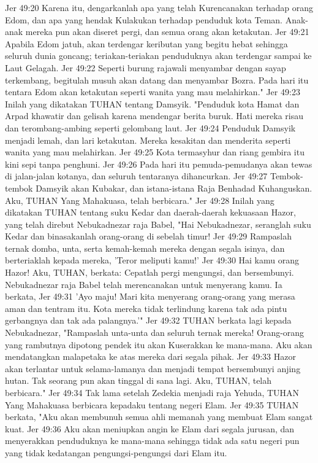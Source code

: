 Jer 49:20  Karena itu, dengarkanlah apa yang telah Kurencanakan terhadap orang Edom, dan apa yang hendak Kulakukan terhadap penduduk kota Teman. Anak-anak mereka pun akan diseret pergi, dan semua orang akan ketakutan.
Jer 49:21  Apabila Edom jatuh, akan terdengar keributan yang begitu hebat sehingga seluruh dunia goncang; teriakan-teriakan penduduknya akan terdengar sampai ke Laut Gelagah.
Jer 49:22  Seperti burung rajawali menyambar dengan sayap terkembang, begitulah musuh akan datang dan menyambar Bozra. Pada hari itu tentara Edom akan ketakutan seperti wanita yang mau melahirkan."
Jer 49:23  Inilah yang dikatakan TUHAN tentang Damsyik. "Penduduk kota Hamat dan Arpad khawatir dan gelisah karena mendengar berita buruk. Hati mereka risau dan terombang-ambing seperti gelombang laut.
Jer 49:24  Penduduk Damsyik menjadi lemah, dan lari ketakutan. Mereka kesakitan dan menderita seperti wanita yang mau melahirkan.
Jer 49:25  Kota termasyhur dan riang gembira itu kini sepi tanpa penghuni.
Jer 49:26  Pada hari itu pemuda-pemudanya akan tewas di jalan-jalan kotanya, dan seluruh tentaranya dihancurkan.
Jer 49:27  Tembok-tembok Damsyik akan Kubakar, dan istana-istana Raja Benhadad Kuhanguskan. Aku, TUHAN Yang Mahakuasa, telah berbicara."
Jer 49:28  Inilah yang dikatakan TUHAN tentang suku Kedar dan daerah-daerah kekuasaan Hazor, yang telah direbut Nebukadnezar raja Babel, "Hai Nebukadnezar, seranglah suku Kedar dan binasakanlah orang-orang di sebelah timur!
Jer 49:29  Rampaslah ternak domba, unta, serta kemah-kemah mereka dengan segala isinya, dan berteriaklah kepada mereka, 'Teror meliputi kamu!'
Jer 49:30  Hai kamu orang Hazor! Aku, TUHAN, berkata: Cepatlah pergi mengungsi, dan bersembunyi. Nebukadnezar raja Babel telah merencanakan untuk menyerang kamu. Ia berkata,
Jer 49:31  'Ayo maju! Mari kita menyerang orang-orang yang merasa aman dan tentram itu. Kota mereka tidak terlindung karena tak ada pintu gerbangnya dan tak ada palangnya.'"
Jer 49:32  TUHAN berkata lagi kepada Nebukadnezar, "Rampaslah unta-unta dan seluruh ternak mereka! Orang-orang yang rambutnya dipotong pendek itu akan Kuserakkan ke mana-mana. Aku akan mendatangkan malapetaka ke atas mereka dari segala pihak.
Jer 49:33  Hazor akan terlantar untuk selama-lamanya dan menjadi tempat bersembunyi anjing hutan. Tak seorang pun akan tinggal di sana lagi. Aku, TUHAN, telah berbicara."
Jer 49:34  Tak lama setelah Zedekia menjadi raja Yehuda, TUHAN Yang Mahakuasa berbicara kepadaku tentang negeri Elam.
Jer 49:35  TUHAN berkata, "Aku akan membunuh semua ahli memanah yang membuat Elam sangat kuat.
Jer 49:36  Aku akan meniupkan angin ke Elam dari segala jurusan, dan menyerakkan penduduknya ke mana-mana sehingga tidak ada satu negeri pun yang tidak kedatangan pengungsi-pengungsi dari Elam itu.
